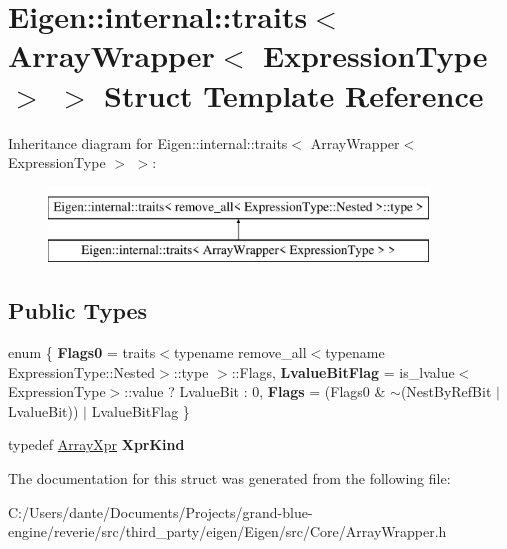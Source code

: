 \hypertarget{struct_eigen_1_1internal_1_1traits_3_01_array_wrapper_3_01_expression_type_01_4_01_4}{}\section{Eigen\+::internal\+::traits$<$ Array\+Wrapper$<$ Expression\+Type $>$ $>$ Struct Template Reference}
\label{struct_eigen_1_1internal_1_1traits_3_01_array_wrapper_3_01_expression_type_01_4_01_4}
Inheritance diagram for Eigen\+::internal\+::traits$<$ Array\+Wrapper$<$ Expression\+Type $>$ $>$\+:\begin{figure}[H]
\begin{center}
\leavevmode
\includegraphics[height=2.000000cm]{struct_eigen_1_1internal_1_1traits_3_01_array_wrapper_3_01_expression_type_01_4_01_4}
\end{center}
\end{figure}
\subsection*{Public Types}
\begin{DoxyCompactItemize}
\item 
\mbox{\label{struct_eigen_1_1internal_1_1traits_3_01_array_wrapper_3_01_expression_type_01_4_01_4_a76e66b402cf74d7d62f4d5c3f81c8eda}} 
enum \{ {\bfseries Flags0} = traits$<$typename remove\+\_\+all$<$typename Expression\+Type\+::Nested$>$\+::type $>$\+::Flags, 
{\bfseries Lvalue\+Bit\+Flag} = is\+\_\+lvalue$<$Expression\+Type$>$\+::value ? Lvalue\+Bit \+: 0, 
{\bfseries Flags} = (Flags0 \& $\sim$(Nest\+By\+Ref\+Bit $\vert$ Lvalue\+Bit)) $\vert$ Lvalue\+Bit\+Flag
 \}
\item 
\mbox{\label{struct_eigen_1_1internal_1_1traits_3_01_array_wrapper_3_01_expression_type_01_4_01_4_ac2e2f91554c6a8582dc117f67212a036}} 
typedef \mbox{\hyperlink{struct_eigen_1_1_array_xpr}{Array\+Xpr}} {\bfseries Xpr\+Kind}
\end{DoxyCompactItemize}


The documentation for this struct was generated from the following file\+:\begin{DoxyCompactItemize}
\item 
C\+:/\+Users/dante/\+Documents/\+Projects/grand-\/blue-\/engine/reverie/src/third\+\_\+party/eigen/\+Eigen/src/\+Core/Array\+Wrapper.\+h\end{DoxyCompactItemize}
